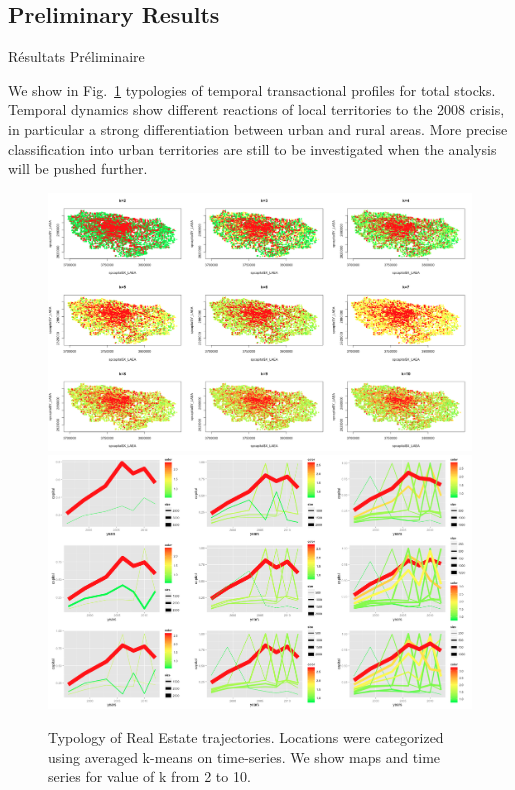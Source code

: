 \subsection{Preliminary Results}{Résultats Préliminaire}


We show in Fig.~\ref{fig:realestate} typologies of temporal transactional profiles for total stocks. Temporal dynamics show different reactions of local territories to the 2008 crisis, in particular a strong differentiation between urban and rural areas. More precise classification into urban territories are still to be investigated when the analysis will be pushed further.



\begin{figure}
\hspace{-3cm}\includegraphics[width=1.4\textwidth]{Figures/RealEstate/normalized_k2-10}
\smallskip
\hspace{-3cm}\includegraphics[width=1.4\textwidth]{Figures/RealEstate/trajectories_normalized_k=2-10}
\caption[Typology of Real Estate trajectories]{Typology of Real Estate trajectories. Locations were categorized using averaged k-means on time-series. We show maps and time series for value of k from 2 to 10.}{}
\label{fig:realestate}
\end{figure}



